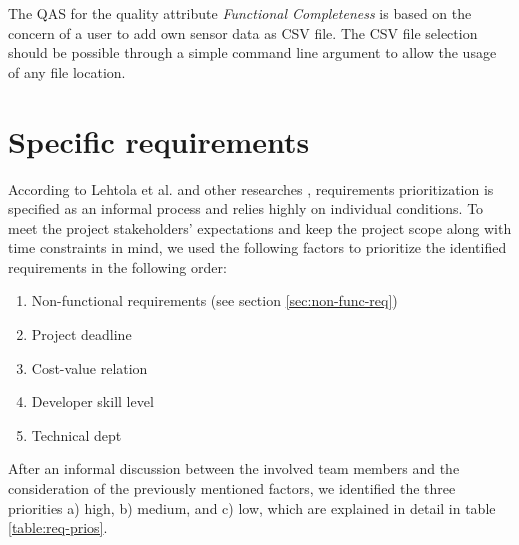 \documentclass[a4paper]{article}
\begin{document}
The QAS for the quality attribute \textit{Functional Completeness} is based on the concern of a user to add own sensor data as CSV file. The CSV file selection should be possible through a simple command line argument to allow the usage of any file location.


\clearpage
\section{Specific requirements}
\label{sec:func-req}

According to Lehtola et al. \cite{b5} and other researches \cite{b6, b7}, requirements prioritization is specified as an informal process and relies highly on individual conditions. To meet the project stakeholders' expectations and keep the project scope along with time constraints in mind, we used the following factors to prioritize the identified requirements in the following order:

\begin{enumerate}
    \item Non-functional requirements (see section \ref{sec:non-func-req})
    \item Project deadline
    \item Cost-value relation
    \item Developer skill level
    \item Technical dept
\end{enumerate}

After an informal discussion between the involved team members and the consideration of the previously mentioned factors, we identified the three priorities a) high, b) medium, and c) low, which are explained in detail in table \ref{table:req-prios}.
\end{document}
